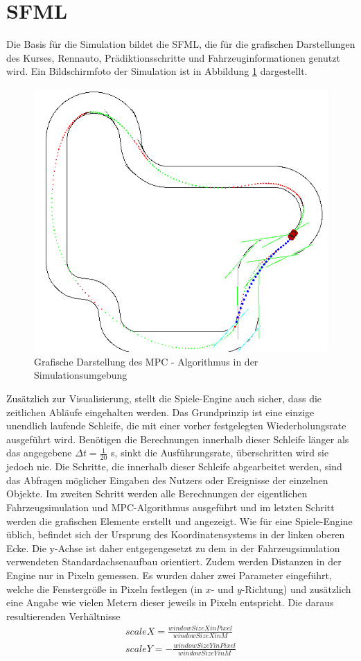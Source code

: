 \documentclass{like}
\begin{document}
\section{\acl{SFML}}
Die Basis für die Simulation bildet die \ac{SFML}, die für die grafischen Darstellungen des Kurses, Rennauto, Prädiktionsschritte und Fahrzeuginformationen genutzt wird. Ein Bildschirmfoto der Simulation ist in Abbildung \ref{fig:simVisual} dargestellt.
\begin{figure}[ht!]
	\centering
	\includegraphics[width=350pt]{Abbildungen/sim_visual.png}
	\caption{Grafische Darstellung des MPC - Algorithmus in der Simulationsumgebung}
	\label{fig:simVisual}
\end{figure} 
Zusätzlich zur Visualisierung, stellt die Spiele-Engine auch sicher, dass die zeitlichen Abläufe eingehalten werden. Das Grundprinzip ist eine einzige unendlich laufende Schleife, die mit einer vorher festgelegten Wiederholungsrate ausgeführt wird. Benötigen die Berechnungen innerhalb dieser Schleife länger als das angegebene
$\Delta t =  \frac{1}{20}$ s, sinkt die Ausführungsrate, überschritten wird sie jedoch nie. Die Schritte, die innerhalb dieser Schleife abgearbeitet werden, sind das Abfragen möglicher Eingaben des Nutzers oder Ereignisse der einzelnen Objekte. Im zweiten Schritt werden alle Berechnungen der eigentlichen Fahrzeugsimulation und \ac{MPC}-Algorithmus ausgeführt und im letzten Schritt werden die grafischen Elemente erstellt und angezeigt. Wie für eine Spiele-Engine üblich, befindet sich der Ursprung des Koordinatensystems in der linken oberen Ecke. Die y-Achse ist daher entgegengesetzt zu dem in der Fahrzeugsimulation verwendeten Standardachsenaufbau orientiert. Zudem werden Distanzen in der Engine nur in Pixeln gemessen. Es wurden daher zwei Parameter eingeführt, welche die Fenstergröße in Pixeln festlegen (in \(x\)- und  \(y\)-Richtung) und zusätzlich eine Angabe wie vielen Metern dieser jeweils in Pixeln entspricht. Die daraus resultierenden Verhältnisse 
\begin{eqnarray}
	scaleX = \frac{windowSizeXinPixel}{windowSizeXinM} \\
	scaleY = - \frac{windowSizeYinPixel}{windowSizeYinM} 
\end{eqnarray}
\end{document}

